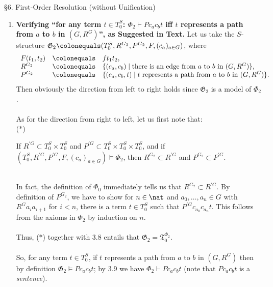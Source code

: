\
\\
\\
{\large \S6. First-Order Resolution (without Unification)}
\begin{enumerate}[1.]
\item \textbf{Verifying ``for any term $t \in T^S_0$: $\Phi_2 \vdash Pc_ac_bt$ iff $t$ represents a path from $a$ to $b$ in $(G, R^G)$'', as Suggested in Text.} Let us take the $S$-structure $\mathfrak{G}_2 \colonequals (T^S_0, R^{G_2}, P^{G_2}, F, (c_a)_{a \in G})$, where
\[
\begin{array}{lll}
F(t_1, t_2) & \colonequals & f t_1 t_2, \cr
R^{G_2} & \colonequals & \{ (c_a, c_b) \mid \mbox{there is an edge from $a$ to $b$ in $(G, R^G)$} \}, \cr
P^{G_2} & \colonequals & \{ (c_a, c_b, t) \mid \mbox{$t$ represents a path from $a$ to $b$ in $(G, R^G)$} \}.
\end{array}
\]
Then obviously the direction from left to right holds since $\mathfrak{G}_2$ is a model of $\Phi_2$.\\
\ \\
As for the direction from right to left, let us first note that:\\
($\ast$) \ \ \begin{minipage}{10cm}
If $R^{\prime G} \subset T^S_0 \times T^S_0$ and $P^{\prime G} \subset T^S_0 \times T^S_0 \times T^S_0$, and if $(T^S_0, R^{\prime G}, P^{\prime G}, F, (c_a)_{a \in G}) \models \Phi_2$, then $R^{G_2} \subset R^{\prime G}$ and $P^{G_2} \subset P^{\prime G}$.\end{minipage}\\
In fact, the definition of $\Phi_0$ immediately tells us that $R^{G_2} \subset R^{\prime G}$. By definition of $P^{G_2}$, we have to show for $n \in \nat$ and $a_0, \ldots, a_n \in G$ with $R^G a_i a_{i + 1}$ for $i < n$, there is a term $t \in T^S_0$ such that $P^{\prime G} c_{a_0} c_{a_n} t$. This follows from the axioms in $\Phi_2$ by induction on $n$.\\
\ \\
Thus, ($\ast$) together with 3.8 entails that $\mathfrak{G}_2 = \mathfrak{T}_0^{\Phi_2}$.\\
\ \\
So, for any term $t \in T^S_0$, if $t$ represents a path from $a$ to $b$ in $(G, R^G)$ then by definition $\mathfrak{G}_2 \models P c_a c_b t$; by 3.9 we have $\Phi_2 \vdash P c_a c_b t$ (note that $P c_a c_b t$ is a \emph{sentence}).

\end{enumerate}
